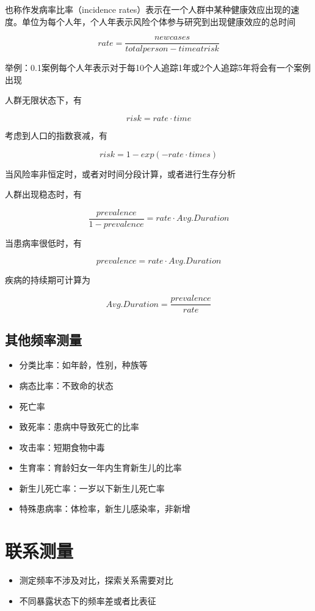 \documentclass[]{book}
\providecommand{\tightlist}{%
  \setlength{\itemsep}{0pt}\setlength{\parskip}{0pt}}
\begin{document}
也称作发病率比率（incidence rates）表示在一个人群中某种健康效应出现的速度。单位为每个人年，个人年表示风险个体参与研究到出现健康效应的总时间

\[rate = \frac{new cases}{total person-time at risk}\]

举例：0.1案例每个人年表示对于每10个人追踪1年或2个人追踪5年将会有一个案例出现

人群无限状态下，有

\[risk = rate \cdot time\]

考虑到人口的指数衰减，有

\[risk = 1 - exp(- rate \cdot times)\]

当风险率非恒定时，或者对时间分段计算，或者进行生存分析

人群出现稳态时，有

\[\frac{prevalence}{1-prevalence} = rate \cdot Avg.Duration\]

当患病率很低时，有

\[prevalence = rate \cdot Avg.Duration\]

疾病的持续期可计算为

\[Avg.Duration = \frac{prevalence}{rate}\]

\subsection{其他频率测量}

\begin{itemize}
\tightlist
\item
  分类比率：如年龄，性别，种族等
\item
  病态比率：不致命的状态
\item
  死亡率
\item
  致死率：患病中导致死亡的比率
\item
  攻击率：短期食物中毒
\item
  生育率：育龄妇女一年内生育新生儿的比率
\item
  新生儿死亡率：一岁以下新生儿死亡率
\item
  特殊患病率：体检率，新生儿感染率，非新增
\end{itemize}

\section{联系测量}

\begin{itemize}
\tightlist
\item
  测定频率不涉及对比，探索关系需要对比
\item
  不同暴露状态下的频率差或者比表征
\end{itemize}
\end{document}
